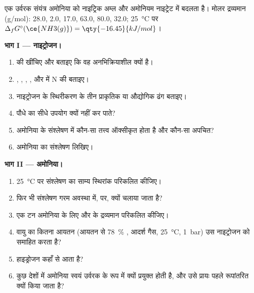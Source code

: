 \begin{problem}
\label{pb:b1:p-block-13-15:1}
एक उर्वरक संयंत्र अमोनिया को नाइट्रिक अम्ल और अमोनियम
नाइट्रेट में बदलता है। मोलर द्रव्यमान (\unit{g/mol}):  28.0,  2.0, 
17.0,  63.0,  80.0,  32.0;
\qty{25}{\celsius} पर $\Delta_f G^\circ(\ce{NH3(g)}) = \qty{-16.45}{kJ/mol}$।

\medskip
\noindent\textbf{भाग I --- नाइट्रोजन।}
\begin{enumerate}
  \item {} की  खींचिए और बताइए कि वह अनभिक्रियाशील क्यों है।
  \item {}, , ,
        ,  और  में N की  बताइए।
  \item नाइट्रोजन के स्थिरीकरण के तीन प्राकृतिक या औद्योगिक ढंग बताइए।
  \item पौधे  का सीधे उपयोग क्यों नहीं कर पाते?
  \item अमोनिया के संश्लेषण में कौन-सा तत्त्व ऑक्सीकृत होता है और कौन-सा अपचित?
  \item अमोनिया का संश्लेषण लिखिए।
\end{enumerate}

\medskip
\noindent\textbf{भाग II --- अमोनिया।}
\begin{enumerate}[resume]
  \item \qty{25}{\celsius} पर संश्लेषण का साम्य स्थिरांक परिकलित
        कीजिए।
  \item फिर भी संश्लेषण गरम अवस्था में,  पर, क्यों चलाया जाता है?
  \item एक टन अमोनिया के लिए  और  के द्रव्यमान परिकलित
        कीजिए।
  \item वायु का कितना आयतन (आयतन से \qty{78}{\percent} , आदर्श
        गैस, \qty{25}{\celsius}, \qty{1}{bar}) उस नाइट्रोजन को समाहित करता है?
  \item हाइड्रोजन कहाँ से आता है?
  \item कुछ देशों में अमोनिया स्वयं उर्वरक के रूप में क्यों प्रयुक्त होती है, और
        उसे प्रायः पहले रूपांतरित क्यों किया जाता है?
\end{enumerate}


\end{problem}
